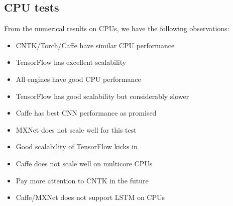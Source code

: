 \documentclass[11pt, oneside]{article}   	%
\begin{document}
\subsection{CPU tests}

From the numerical results on CPUs, we have the following observations:
\begin{itemize}
\item CNTK/Torch/Caffe have similar CPU performance
\item TensorFlow has excellent scalability
\item All engines have good CPU performance
\item TensorFlow has good scalability but considerably slower
\item Caffe has best CNN performance as promised
\item MXNet does not scale well for this test
\item Good scalability of TensorFlow kicks in 
\item Caffe does not scale well on multicore CPUs
\item Pay more attention to CNTK in the future
\item Caffe/MXNet does not support LSTM on CPUs
\end{itemize}
\end{document}
